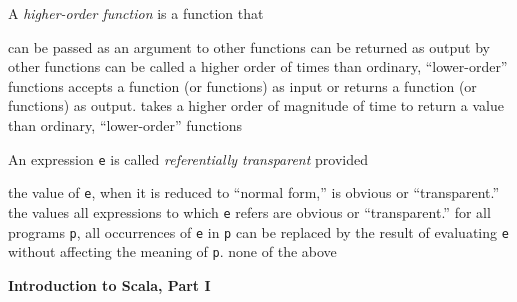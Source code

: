\begin{questions}
\vskip1cm

  \question[2] A \textit{higher-order function} is a function that
  \begin{checkboxes}
    \choice can be passed as an argument to other functions
    \choice can be returned as output by other functions
    \choice can be called a higher order of times than ordinary, ``lower-order'' functions
    \CorrectChoice accepts a function (or functions) as input or returns a function (or functions) as output.
    \choice takes a higher order of magnitude of time to return a value than ordinary, ``lower-order'' functions
  \end{checkboxes}


\vskip1cm

  \question[2] An expression \texttt{e} is called \textit{referentially transparent} provided
  \begin{checkboxes}
    \choice the value of \texttt{e}, when it is reduced to ``normal form,'' is obvious or ``transparent.''
    \choice the values all expressions to which \texttt{e} refers are obvious or ``transparent.''
    \CorrectChoice for all programs \texttt{p}, all occurrences of \texttt{e} in \texttt{p} can be replaced by the result of evaluating \texttt{e} without affecting the meaning of \texttt{p}.
    \choice none of the above
  \end{checkboxes}

\newpage

  \question[6] \textbf{Introduction to Scala, Part I}

\end{questions}

